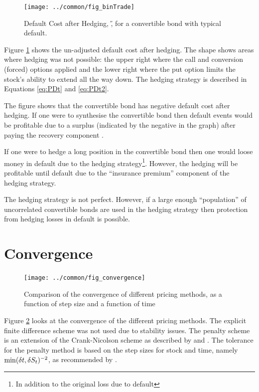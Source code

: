\documentclass[a4paper,11pt,oneside]{report}
\theoremstyle{plain}
\theoremstyle{definition}
\begin{document}
\begin{figure}[htb!]
 \centering
 \texttt{[image: ../common/fig\_binTrade]}
 \caption[Default Cost after Hedging]{Default Cost after Hedging, \H, for a convertible bond with typical default.}
 \label{fig:binTrade}
\end{figure}

Figure \ref{fig:binTrade} shows the un-adjusted default cost after hedging.  The shape shows areas where hedging was not possible: the upper right where the call and conversion (forced) options applied and the lower right where the put option limits the stock's ability to extend all the way down.  The hedging strategy is described in Equations \ref{eq:PDt} and \ref{eq:PDt2}.

The figure shows that the convertible bond has negative default cost after hedging.  If one were to synthesise the convertible bond then default events would be profitable due to a surplus (indicated by the negative in the graph) after paying the recovery component \X.

If one were to hedge a long position in the convertible bond then one would loose money in default due to the hedging strategy\footnote{In addition to the original loss due to default}.  However, the hedging will be profitable until default due to the ``insurance premium'' component of the hedging strategy.

The hedging strategy is not perfect.  However, if a large enough ``population'' of uncorrelated convertible bonds are used in the hedging strategy then protection from hedging losses in default is possible.


\section{Convergence}

\begin{figure}[htb!]
 \centering
 \texttt{[image: ../common/fig\_convergence]}
 \caption[Convergence of pricing methods]{Comparison of the convergence of different pricing methods, as a function of step size and a function of time}
 \label{fig:convergence}
\end{figure}

Figure \ref{fig:convergence} looks at the convergence of the different pricing methods.  The explicit finite difference scheme was not used due to stability issues.  The penalty scheme is an extension of the Crank-Nicolson scheme as described by \citet{AL98} and \citet{CD11}.  The tolerance for the penalty method is based on the step sizes for stock and time, namely $\min(\delta t, \delta S_t)^{-2}$, as recommended by \citet{FV02}.
\end{document}
